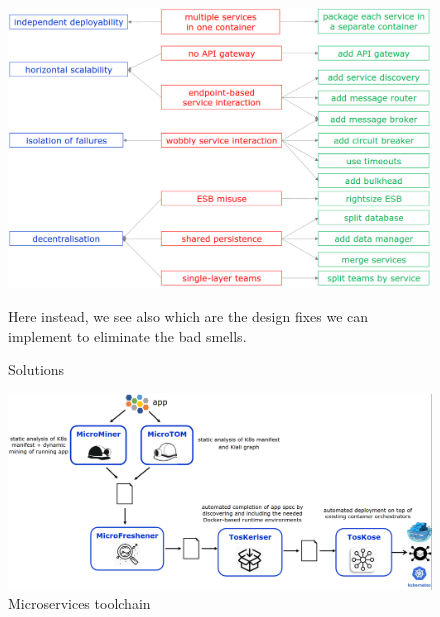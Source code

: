 \begin{figure}[htbp]
   \centering
   \includegraphics{images/smells_principles_solutions.png}
   \caption{Solutions}
   Here instead,
   we see also which are the design fixes we can implement to eliminate the bad smells.
   \label{fig:smells_principles_solutions}
\end{figure}


\begin{figure}[htbp]
   \centering
   \includegraphics{images/microtoolchain.png}
   \caption{Microservices toolchain}
   \label{fig:microtoolchain}
\end{figure}